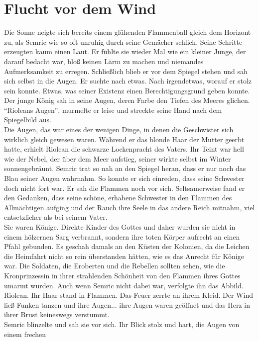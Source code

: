 \chapter{Flucht vor dem Wind}

Die Sonne neigte sich bereits einem glühenden Flammenball gleich dem Horizont 
zu, als Semric wie so oft unruhig durch seine Gemächer schlich. Seine Schritte erzeugten kaum einen 
Laut. Er fühlte sie wieder Mal wie ein kleiner Junge, der darauf bedacht war, bloß keinen Lärm zu 
machen und niemandes Aufmerksamkeit zu erregen. Schließlich blieb er vor dem Spiegel stehen und sah 
sich selbst in die Augen. Er suchte nach etwas. Nach irgendetwas, worauf er stolz sein konnte. 
Etwas, was seiner Existenz einen Berechtigungsgrund geben konnte. Der junge König sah in seine 
Augen, deren Farbe den Tiefen des Meeres glichen.\\
``Rioleans Augen'', murmelte er leise und streckte seine Hand nach dem Spiegelbild aus. \\
Die Augen, das war eines der wenigen Dinge, in denen die Geschwister sich wirklich gleich gewesen 
waren. Während er das blonde Haar der Mutter geerbt hatte, erhielt Riolean die schwarze Lockenpracht 
des Vaters. Ihr Teint war hell wie der Nebel, der über dem Meer aufstieg, seiner wirkte selbst im 
Winter sonnengebräunt. Semric trat so nah an den Spiegel heran, dass er nur noch das Blau seiner 
Augen wahrnahm. So konnte er sich einreden, dass seine Schwester doch nicht fort war. Er sah die 
Flammen noch vor sich. Seltsamerweise fand er den Gedanken, dass seine schöne, erhabene Schwester in 
den Flammen des Allmächtigen aufging und der Rauch ihre Seele in das andere Reich mitnahm, viel 
entsetzlicher als bei seinem Vater.\\
Sie waren Könige. Direkte Kinder des Gottes und daher wurden sie nicht in einem hölzernen Sarg 
verbrannt, sondern ihre toten Körper aufrecht an einen Pfahl gebunden. Es geschah damals an den 
Küsten der Kolonien, da die Leichen die Heimfahrt nicht so rein überstanden hätten, wie es das 
Anrecht für Könige war. Die Soldaten, die Eroberten und die Rebellen sollten sehen, wie die 
Kronprinzessin in ihrer strahlenden Schönheit von den Flammen ihres Gottes umarmt wurden. Auch wenn 
Semric nicht dabei war, verfolgte ihn das Abbild. Riolean. Ihr Haar stand in Flammen. Das Feuer 
zerrte an ihrem Kleid. Der Wind ließ Funken tanzen und ihre Augen... ihre Augen waren geöffnet und 
das Herz in ihrer Brust keineswegs verstummt. \\
Semric blinzelte und sah sie vor sich. Ihr Blick stolz und hart, die Augen von einem frechen 
